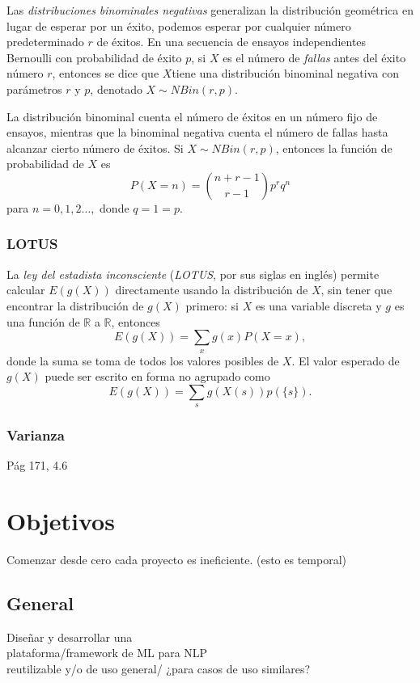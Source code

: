 \documentclass[letterpaper]{article}
\begin{document}
Las \emph{distribuciones binominales negativas} generalizan la distribución geométrica en lugar de esperar por un éxito, podemos esperar por cualquier número predeterminado $r$ de éxitos. En una secuencia de ensayos independientes Bernoulli con probabilidad de éxito $p$, si $X$ es el número de \emph{fallas} antes del éxito número $r$, entonces se dice que $X$tiene una distribución binominal negativa con parámetros $r$ y $p$, denotado $X\sim NBin(r,p)$.

La distribución binominal cuenta el número de éxitos en un número fijo de ensayos, mientras que la binominal negativa cuenta el número de fallas hasta alcanzar cierto número de éxitos. Si $X\sim NBin(r,p)$, entonces la función de probabilidad de $X$ es
\begin{equation}
P(X=n)=\binom{n+r-1}{r-1}p^rq^n
\end{equation}
para $n=0,1,2\ldots,$ donde $q=1=p$.
\subsubsection{LOTUS}
La \emph{ley del estadista inconsciente} (\emph{LOTUS}, por sus siglas en inglés) permite calcular $E(g(X))$ directamente usando la distribución de $X$, sin tener que encontrar la distribución de $g(X)$ primero: si $X$ es una variable discreta y $g$ es una función de $\mathbb{R}$ a $\mathbb{R}$, entonces
\begin{equation}
E(g(X))=\sum_{x}g(x)P(X=x),
\end{equation}
donde la suma se toma de todos los valores posibles de $X$. El valor esperado de $g(X)$ puede ser escrito en forma no agrupado como
\begin{equation}
E(g(X))=\sum_{s}g(X(s))p(\{s\}).
\end{equation}
\subsubsection{Varianza}
Pág 171, 4.6
\section {Objetivos}
Comenzar desde cero cada proyecto es ineficiente. (esto es temporal)
\subsection {General}
Diseñar y desarrollar una\\
plataforma/framework de ML para NLP\\
reutilizable y/o de uso general/ ¿para casos de uso similares?
\end{document}
